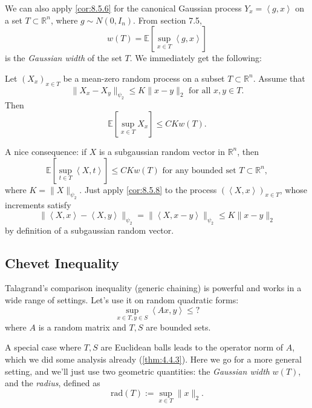 We can also apply \cref{cor:8.5.6} for the canonical Gaussian process $Y_x = \left\langle g, x \right\rangle$ on 
a set $T \subset \mathbb{R}^n$, where $g \sim N(0, I_n)$. From section 7.5, 
\[ w(T) = \mathbb{E}\left[ \sup_{x \in T}\left\langle g, x \right\rangle \right] \]
is the \textit{Gaussian width} of the set $T$. We immediately get the following:

\begin{corollary}
\label{cor:8.5.8}
Let $(X_x)_{x \in T}$ be a mean-zero random process on a subset $T \subset \mathbb{R}^n$. Assume that 
\[ \lVert X_x - X_y \rVert_{\psi_2} \leq K \lVert x - y \rVert_{2} \text{ for all } x, y \in T. \]
Then 
\[ \mathbb{E}\left[ \sup_{x \in T}X_x \right] \leq CK w(T). \]
\end{corollary}

\begin{remark}
\label{rmk:8.5.9}
A nice consequence: if $X$ is a subgaussian random vector in $\mathbb{R}^n$, then 
\[ \mathbb{E}\left[ \sup_{t \in T}\left\langle X, t \right\rangle \right] \leq CKw(T) 
\text{ for any bounded set } T \subset \mathbb{R}^n, \]
where $K = \lVert X \rVert_{\psi_2}$. Just apply \cref{cor:8.5.8} to the process $(\left\langle X, x 
\right\rangle )_{x \in T}$, whose increments satisfy 
\[ \lVert \left\langle X, x \right\rangle - \left\langle X, y \right\rangle \rVert_{\psi_2} 
= \lVert \left\langle X, x - y \right\rangle \rVert_{\psi_2} \leq K \lVert x - y \rVert_{2} \]
by definition of a subgaussian random vector.
\end{remark}



\subsection{Chevet Inequality}
Talagrand's comparison inequality (generic chaining) is powerful and works in a wide range of settings. Let's 
use it on random quadratic forms: 
\[ \sup_{x \in T, y \in S} \left\langle Ax, y \right\rangle \leq ? \]
where $A$ is a random matrix and $T, S$ are bounded sets.

A special case where $T, S$ are Euclidean balls leads to the operator norm of $A$, which we did some analysis 
already (\cref{thm:4.4.3}). Here we go for a more general setting, and we'll just use two geometric quantities: 
the \textit{Gaussian width} $w(T)$, and the \textit{radius}, defined as 
\[ \mathrm{rad}(T) := \sup_{x \in T}\lVert x \rVert_{2}. \]

